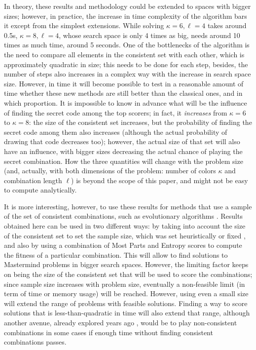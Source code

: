 \documentclass[preprint,12pt]{elsarticle}
\begin{document}
In theory, these results and methodology could be extended to spaces with bigger sizes;
however, in practice, the increase in time complexity of the algorithm
bars it except from the simplest extensions. While solving  $\kappa=6,
\ell=4$ takes around 0.5s, $\kappa=8,\ell=4$, whose search space is
only 4 times as big, needs around 10 times as much time, around 5
seconds. One of the bottlenecks of the algorithm is the need to
compare all elements in the consistent set with each other, which is
approximately quadratic in size; this needs to be done for each
step, besides, the number of steps also increases in a complex way
with the increase in search space size. However, in time it will
become possible to test in a reasonable amount of time whether these
new methods are still better than the classical ones, and in which
proportion. It is impossible to know in advance what will be the
influence of finding the secret code among the top scorers; in fact,
it {\em increases} from  $\kappa=6$ to $\kappa=8$: the size of the
consistent set increases, but  the probability of finding
the secret code among them also increases (although the actual
probability of drawing that code decreases too); however, the actual size of
that set will also have an influence, with bigger sizes decreasing the
actual chance of playing the secret combination. How the three
quantities will change with the problem size (and, actually, with both
dimensions of the problem: number of colors $\kappa$ and combination
length $\ell$) is beyond the scope of this paper, and might not be easy
to compute analytically. 

It is more interesting, however, to use these results for methods that
use a sample of the set of consistent combinations, such as
evolutionary algorithms
\cite{DBLP:conf/evoW/GuervosCM11,Berghman20091880}. Results obtained
here can be used in two different ways: by taking into account the
size of the consistent set to set the sample size, which was set
heuristically \cite{nicso} or fixed \cite{Berghman20091880}, and also
by using a combination of Most Parts and Entropy scores to compute the
fitness of a particular combination. This will allow to find solutions
to Mastermind problems in bigger search spaces. However, the limiting
factor keeps on being the size of the consistent set that will be used
to score the combinations; since sample size increases with problem
size, eventually a non-feasible limit (in term of time or memory
usage) will be reached. However, using even a small size will extend
the range of problems with feasible solutions. Finding a way to score
solutions that is less-than-quadratic in time will also extend that
range, although another avenue, already explored years ago
\cite{jj-ppsn96}, would be to play non-consistent combinations in some
cases if enough time without finding consistent combinations passes.
\end{document}
